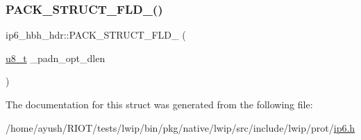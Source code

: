 \mbox{\label{structip6__hbh__hdr_afc8d541ae3a0368a9fb83f6f85a0d67e}} 
\subsubsection{\texorpdfstring{P\+A\+C\+K\+\_\+\+S\+T\+R\+U\+C\+T\+\_\+\+F\+L\+D\+\_()}{PACK\_STRUCT\_FLD\_8()}\hspace{0.1cm}{\footnotesize\ttfamily [12/12]}}
{\footnotesize\ttfamily ip6\+\_\+hbh\+\_\+hdr\+::\+P\+A\+C\+K\+\_\+\+S\+T\+R\+U\+C\+T\+\_\+\+F\+L\+D\+\_ (\begin{DoxyParamCaption}\item[{\hyperlink{group__compiler__abstraction_ga4caecabca98b43919dd11be1c0d4cd8e}{u8\+\_\+t}}]{\+\_\+padn\+\_\+opt\+\_\+dlen }\end{DoxyParamCaption})}



The documentation for this struct was generated from the following file\+:\begin{DoxyCompactItemize}
\item 
/home/ayush/\+R\+I\+O\+T/tests/lwip/bin/pkg/native/lwip/src/include/lwip/prot/\hyperlink{native_2lwip_2src_2include_2lwip_2prot_2ip6_8h}{ip6.\+h}\end{DoxyCompactItemize}
